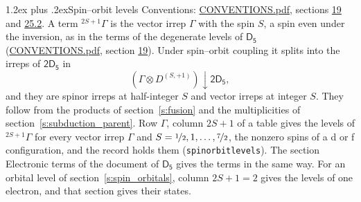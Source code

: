 \documentclass[10pt,a4paper]{article}
\makeatletter
\renewcommand\section{\@startsection{section}{1}{\z@}{-3ex plus -1ex minus -.2ex}%
  {1.2ex plus .2ex}{\normalfont\large\sffamily\bfseries\color{parttitle}}}
\numberwithin{equation}{section}
\newcommand{\grp}[1]{\mathsf{#1}}
\newcommand{\restr}[2]{#1\!\downarrow#2}
\newcommand{\irrJp}[2]{D^{(#1,#2)}}
\newcommand{\irrprod}{\otimes}
\newcommand{\term}[2]{{}^{#1}#2}
\makeatother
\begin{document}
\section{Spin--orbit levels}\label{s:spin_orbit}
Conventions: \href{../../CONVENTIONS.pdf}{CONVENTIONS.pdf}, sections \href{../../../rotation/CONVENTIONS.pdf\#conv.19}{19} and \href{../../CONVENTIONS.pdf\#conv.25.2}{25.2}.
\leavevmode\label{n:local.spin}\label{n:symbol.term}A term $\term{2S+1}{\Gamma}$ is the vector irrep $\Gamma$ with the spin $S$, a spin even under the inversion, as in the terms of the degenerate levels of \href{../../../rotation/data/pdf/D5.pdf}{$\grp{D_{5}}$} (\href{../../CONVENTIONS.pdf}{CONVENTIONS.pdf}, section \href{../../../rotation/CONVENTIONS.pdf\#conv.19}{19}). Under spin--orbit coupling it splits into the irreps of $\grp{2D_{5}}$ in
\begin{equation}\label{e:spinorbit}\restr{(\Gamma \irrprod \irrJp{S}{+1})}{\grp{2D_{5}}},\end{equation}
and they are spinor irreps at half-integer $S$ and vector irreps at integer $S$. They follow from the products of section~\ref{s:fusion} and the multiplicities of section~\ref{s:subduction_parent}. Row $\Gamma$, column $2S + 1$ of a table gives the levels of $\term{2S+1}{\Gamma}$ for every vector irrep $\Gamma$ and $S = \nicefrac{1}{2}, 1, \dots, \nicefrac{7}{2}$, the nonzero spins of a d or f configuration, and the record holds them (\texttt{spinorbitlevels}). The section Electronic terms of the document of \href{../../../rotation/data/pdf/D5.pdf}{$\grp{D_{5}}$} gives the terms in the same way. For an orbital level of section~\ref{s:spin_orbitals}, column $2S + 1 = 2$ gives the levels of one electron, and that section gives their states.
\end{document}
